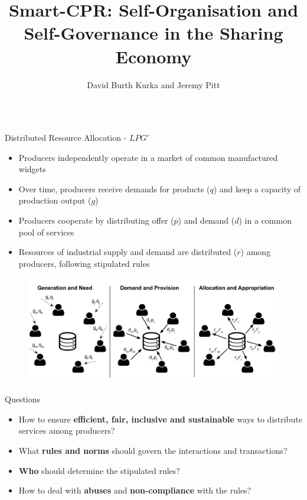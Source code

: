\documentclass[xcolor={table}]{beamer}
\title{Smart-CPR: Self-Organisation and Self-Governance \newline in the Sharing Economy}
\author{David Burth Kurka and Jeremy Pitt}
\institute{Department of Electrical and Electronic Engineering, Imperial College London}
\begin{document}
\begin{frame}[fragile=singleslide,t]\centering

\maketitle

\begin{columns}[onlytextwidth,T]

\begin{column}{.48\textwidth}

\begin{block}{Distributed Resource Allocation - $LPG'$}

\begin{itemize}
\item Producers independently operate in a market of common manufactured widgets
\item Over time, producers receive demands for products ($q$) and keep a capacity of production output ($g$)
\item Producers cooperate by distributing offer ($p$) and demand ($d$) in a common pool of services
\item Resources of industrial supply and demand are distributed ($r$) among producers, following stipulated rules
\end{itemize}

\begin{figure}
\includegraphics[width=\linewidth]{pics/lpg.pdf}
\end{figure}

\end{block}


\begin{block}{Questions}
\begin{itemize}
\item How to ensure \textbf{efficient, fair, inclusive and sustainable}
ways to distribute services among producers?
\item What \textbf{rules and norms} should
govern the interactions and transactions?
\item \textbf{Who} should determine the
stipulated rules? 
\item How to deal with \textbf{abuses} and \textbf{non-compliance} with the rules?


\end{itemize}
\end{block}
\end{column}
\end{columns}
\end{frame}
\end{document}
